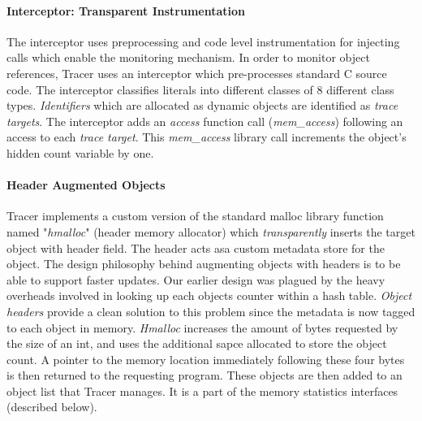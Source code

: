 \paragraph{Interceptor: Transparent Instrumentation}
The interceptor uses preprocessing and code level instrumentation for injecting calls which enable the monitoring mechanism. In order to monitor object references, Tracer uses an interceptor which pre-processes standard C source code. The interceptor classifies literals into different classes of 8 different class types. {\emph{Identifiers}} which are allocated as dynamic objects are identified as {\emph{trace targets}}.  The interceptor adds an {\emph{access}} function call ({\emph{mem\_access}}) following an access to each {\emph{trace target}}. This {\emph{mem\_access}} library call increments the object's hidden count variable by one. 
\paragraph{Header Augmented Objects}
Tracer implements a custom version of the standard malloc library function named "{\emph{hmalloc}}" (header memory allocator) which {\emph{transparently}} inserts the target object with header field. The header acts asa custom metadata store for the object. The design philosophy behind augmenting objects with headers is to be able to support faster updates. Our earlier design was plagued by the heavy overheads involved in looking up each objects counter within a hash table. {\emph{Object headers}} provide a clean solution to this problem since the metadata is now tagged to each object in memory. {\emph{Hmalloc}} increases the amount of bytes requested by the size of an int, and uses the additional sapce allocated to store the object count. A pointer to the memory location immediately following these four bytes is then returned to the requesting program. These objects are then added to an object list that Tracer manages. It is a part of the memory statistics interfaces (described below).
